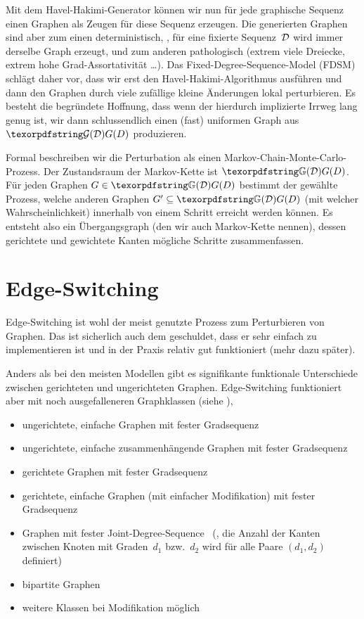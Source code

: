 Mit dem Havel-Hakimi-Generator können wir nun für jede graphische Sequenz einen Graphen als Zeugen für diese Sequenz erzeugen.
Die generierten Graphen sind aber zum einen deterministisch, \dh, für eine fixierte Sequenz~$\mathcal{D}$ wird immer derselbe Graph erzeugt, und zum anderen pathologisch (extrem viele Dreiecke, extrem hohe Grad-Assortativität \ldots).
Das Fixed-Degree-Sequence-Model (FDSM) schlägt daher vor, dass wir erst den Havel-Hakimi-Algorithmus ausführen und dann den Graphen durch viele zufällige kleine Änderungen lokal perturbieren.
Es besteht die begründete Hoffnung, dass wenn der hierdurch implizierte Irrweg lang genug ist, wir dann schlussendlich einen (fast) uniformen Graph aus $\Gd$ produzieren.

Formal beschreiben wir die Perturbation als einen Markov-Chain-Monte-Carlo-Prozess.
Der Zustandsraum der Markov-Kette ist $\gd$.
Für jeden Graphen $G \in \gd$ bestimmt der gewählte Prozess, welche anderen Graphen $G' \subseteq \gd$ (mit welcher Wahrscheinlichkeit) innerhalb von einem Schritt erreicht werden können.
Es entsteht also ein  Übergangsgraph (den wir auch Markov-Kette nennen), dessen gerichtete und gewichtete Kanten mögliche Schritte zusammenfassen.

\section{Edge-Switching}
Edge-Switching ist wohl der meist genutzte Prozess zum Perturbieren von Graphen.
Das ist sicherlich auch dem geschuldet, dass er sehr einfach zu implementieren ist und in der Praxis relativ gut funktioniert (mehr dazu später).

Anders als bei den meisten Modellen gibt es signifikante funktionale Unterschiede zwischen gerichteten und ungerichteten Graphen.
Edge-Switching funktioniert aber mit noch ausgefalleneren Graphklassen (siehe \zB \cite{carstens_2017}), \zB
\begin{itemize}
    \item ungerichtete, einfache Graphen mit fester Gradsequenz
    \item ungerichtete, einfache zusammenhängende Graphen  mit fester Gradsequenz \cite{DBLP:journals/compnet/VigerL16}
    \item gerichtete Graphen  mit fester Gradsequenz
    \item gerichtete, einfache Graphen (mit einfacher Modifikation)  mit fester Gradsequenz
    \item Graphen mit fester Joint-Degree-Sequence~\cite{DBLP:conf/alenex/StantonP11} (\dh, die Anzahl der Kanten zwischen Knoten mit Graden~$d_1$ bzw.~$d_2$ wird für alle Paare $(d_1, d_2)$ definiert)
    \item bipartite Graphen
    \item weitere Klassen bei Modifikation möglich
\end{itemize}


